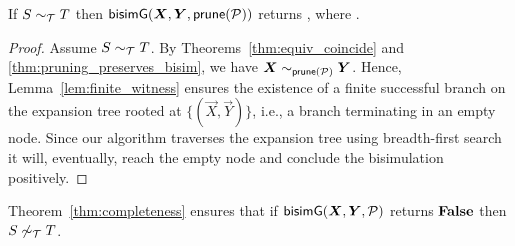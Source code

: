 \begin{theorem}[Completeness]
\label{thm:completeness}
  If $S \sim_\mathcal T T$ then $\Bisim(\vec X, \vec Y, \Prune(\productions))$ 
  returns
  , where \grmcontext.
\end{theorem}
%
\begin{proof}
  Assume $S \sim_\mathcal T T$. By Theorems~\ref{thm:equiv_coincide}
  and \ref{thm:pruning_preserves_bisim},
  we have $\vec X \sim_{\Prune(\productions)} \vec Y$.  Hence,
  Lemma~\ref{lem:finite_witness} ensures the existence of a finite
  successful branch on the expansion tree rooted at
  $\{(\vec X,\vec Y)\}$, i.e., a branch terminating in an empty
  node.  Since our algorithm traverses the expansion tree using
  breadth-first search it will, eventually, reach the empty node and
  conclude the bisimulation positively.
\end{proof}

Theorem~\ref{thm:completeness} ensures that if
$\Bisim(\vec X,\vec Y, \productions)$ returns $\mathbf{False}$ then
$S \not\sim_\mathcal T T$.


